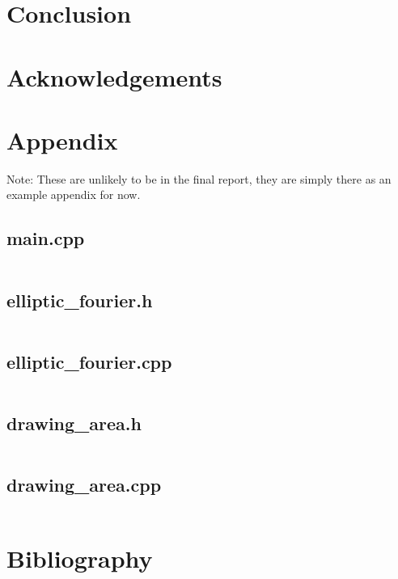 \documentclass[12pt,english]{article}
\begin{document}
\section{Conclusion}

\section{Acknowledgements}

\section{Appendix}
Note: These are unlikely to be in the final report, they are simply there as an example appendix for now.
\subsection*{main.cpp}
\inputminted[breakanywhere=true]{cpp}{../code/elliptic_fourier/main.cpp}
\subsection*{elliptic\_fourier.h}
\inputminted[breakanywhere=true]{cpp}{../code/elliptic_fourier/elliptic_fourier.h}
\subsection*{elliptic\_fourier.cpp}
\inputminted[breakanywhere=true]{cpp}{../code/elliptic_fourier/elliptic_fourier.cpp}
\subsection*{drawing\_area.h}
\inputminted[breakanywhere=true]{cpp}{../code/elliptic_fourier/drawing_area.h}
\subsection*{drawing\_area.cpp}
\inputminted[breakanywhere=true]{cpp}{../code/elliptic_fourier/drawing_area.cpp}

\section{Bibliography}


\end{document}

